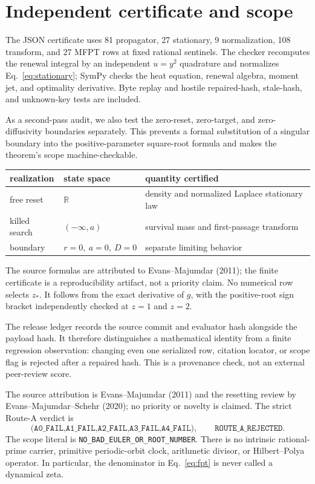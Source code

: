 \documentclass[10pt]{article}
\newcommand{\R}{\mathbb R}
\begin{document}
\section{Independent certificate and scope}
The JSON certificate uses 81 propagator, 27 stationary, 9 normalization,
108 transform, and 27 MFPT rows at fixed rational sentinels.  The checker
recomputes the renewal integral by an independent $u=y^2$ quadrature and
normalizes Eq.~\eqref{eq:stationary}; SymPy checks the heat equation,
renewal algebra, moment jet, and optimality derivative.  Byte replay and
hostile repaired-hash, stale-hash, and unknown-key tests are included.

As a second-pass audit, we also test the zero-reset, zero-target, and
zero-diffusivity boundaries separately.  This prevents a formal substitution
of a singular boundary into the positive-parameter square-root formula and
makes the theorem's scope machine-checkable.

\begin{center}
\begin{tabular}{@{}lll@{}}
\toprule
realization & state space & quantity certified \\
\midrule
free reset & $\R$ & density and normalized Laplace stationary law \\
killed search & $(-\infty,a)$ & survival mass and first-passage transform \\
boundary & $r=0,\ a=0,\ D=0$ & separate limiting behavior \\
\bottomrule
\end{tabular}
\end{center}

The source formulas are attributed to Evans--Majumdar (2011); the finite
certificate is a reproducibility artifact, not a priority claim.  No numerical
row selects $z_*$.  It follows from the exact derivative of $g$, with the
positive-root sign bracket independently checked at $z=1$ and $z=2$.

The release ledger records the source commit and evaluator hash alongside the
payload hash.  It therefore distinguishes a mathematical identity from a
finite regression observation: changing even one serialized row, citation
locator, or scope flag is rejected after a repaired hash.  This is a
provenance check, not an external peer-review score.

The source attribution is Evans--Majumdar (2011) and the resetting review by
Evans--Majumdar--Schehr (2020); no priority or novelty is claimed.  The strict
Route-A verdict is
\[
\texttt{(A0\_FAIL,A1\_FAIL,A2\_FAIL,A3\_FAIL,A4\_FAIL)},\qquad
\texttt{ROUTE\_A\_REJECTED}.
\]
The scope literal is \texttt{NO\_BAD\_EULER\_OR\_ROOT\_NUMBER}.
There is no intrinsic rational-prime carrier, primitive periodic-orbit clock,
arithmetic divisor, or Hilbert--Polya operator.  In particular, the denominator
in Eq.~\eqref{eq:fpt} is never called a dynamical zeta.
\end{document}
